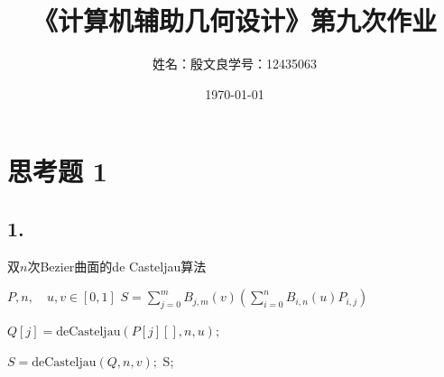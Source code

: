 \documentclass[utf8]{ctexart}
\title{《计算机辅助几何设计》第九次作业}
\author{姓名：殷文良\qquad 学号：12435063}
\date{\today}
\begin{document}
\maketitle
{}

\section*{思考题 1}
\subsection*{1.}

    \begin{algorithm}[H]
        \caption{双$n$次Bezier曲面的de Casteljau算法}
        \label{alg1}
        \renewcommand{\algorithmicrequire}{\textbf{Input:}}
        \renewcommand{\algorithmicensure}{\textbf{Output:}}
        \begin{algorithmic}[1]
            \REQUIRE $P,n,\quad u,v\in[0,1]$
            \ENSURE $S = \sum_{j=0}^mB_{j,m}(v)\left ( \sum_{i=0}^nB_{i,n}(u)P_{i,j}\right )$

            \STATE $Q[j] = \text{deCasteljau}(P[j][], n, u);$
            \ENDFOR

            \STATE $S=\text{deCasteljau}(Q, n, v);$
            \RETURN S;
        \end{algorithmic}
    \end{algorithm}
\end{document}
